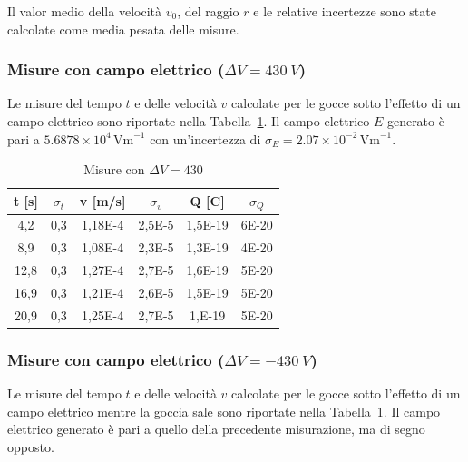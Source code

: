 \documentclass[a4paper,12pt]{article}
\begin{document}
Il valor medio della velocità \( v_0 \), del raggio \( r \)  e le relative incertezze sono state calcolate come media pesata delle misure.


\subsubsection{Misure con campo elettrico (\( \Delta V = \SI{430}{V} \))}

Le misure del tempo \( t \) e delle velocità \( v \) calcolate per le gocce sotto l'effetto di un campo elettrico sono riportate nella Tabella~\ref{tab:campo_elettrico_goccia_sale}. Il campo elettrico \( E \) generato è pari a \( 5.6878 \times 10^4 \, \text{Vm}^{-1} \) con un'incertezza di \( \sigma_E = 2.07 \times 10^{-2} \, \text{Vm}^{-1} \).

\begin{table}[H]
    \centering
    \caption{Misure con $\Delta V = 430$}
    \label{tab:campo_elettrico_goccia_sale}
    \begin{tabular}{cccccc}
    \toprule
    \textbf{t [s]} & \textbf{$\sigma_t$} & \textbf{v [m/s]} & \textbf{$\sigma_v$} & \textbf{Q [C]} & \textbf{$\sigma_Q$} \\
    \midrule
    4,2 & 0,3 & 1,18E-4 & 2,5E-5 & 1,5E-19 & 6E-20 \\
    8,9 & 0,3 & 1,08E-4 & 2,3E-5 & 1,3E-19 & 4E-20 \\
    12,8 & 0,3 & 1,27E-4 & 2,7E-5 & 1,6E-19 & 5E-20 \\
    16,9 & 0,3 & 1,21E-4 & 2,6E-5 & 1,5E-19 & 5E-20 \\
    20,9 & 0,3 & 1,25E-4 & 2,7E-5 & 1,E-19 & 5E-20 \\
    \bottomrule
    \end{tabular}
\end{table}

\subsubsection{Misure con campo elettrico (\( \Delta V = \SI{-430}{V} \))}

Le misure del tempo \( t \) e delle velocità \( v \) calcolate per le gocce sotto l'effetto di un campo elettrico mentre la goccia sale sono riportate nella Tabella~\ref{tab:campo_elettrico_goccia_sale}.  Il campo elettrico generato è pari a quello della precedente misurazione, ma di segno opposto.
\end{document}
